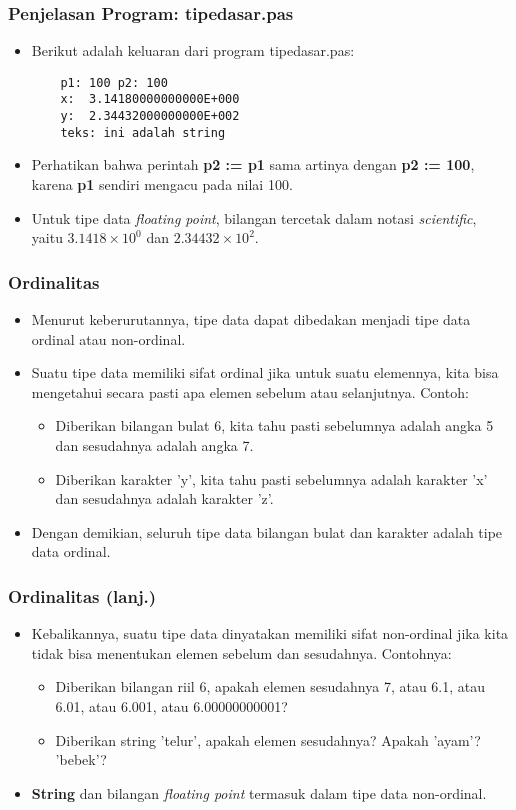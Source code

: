 \documentclass{beamer}
\begin{document}
\begin{frame}[fragile]
\frametitle{Penjelasan Program: tipedasar.pas}
\begin{itemize}
	\item Berikut adalah keluaran dari program tipedasar.pas:
	\begin{lstlisting}
	p1: 100 p2: 100
	x:  3.14180000000000E+000
	y:  2.34432000000000E+002
	teks: ini adalah string
	\end{lstlisting}
	\item Perhatikan bahwa perintah \textbf{p2 := p1} sama artinya dengan \textbf{p2 := 100}, karena \textbf{p1} sendiri mengacu pada nilai 100.
	\item Untuk tipe data \textit{floating point}, bilangan tercetak dalam notasi \textit{scientific}, yaitu $3.1418 \times 10^{0}$ dan $2.34432 \times 10^{2}$.
\end{itemize}
\end{frame}

\begin{frame}
\frametitle{Ordinalitas}
\begin{itemize}
	\item Menurut keberurutannya, tipe data dapat dibedakan menjadi tipe data \alert{ordinal} atau \alert{non-ordinal}.
	\item Suatu tipe data memiliki sifat ordinal jika untuk suatu elemennya, kita bisa mengetahui secara pasti apa elemen sebelum atau selanjutnya. Contoh:
	\begin{itemize}
		\item Diberikan bilangan bulat 6, kita tahu pasti sebelumnya adalah angka 5 dan sesudahnya adalah angka 7.
		\item Diberikan karakter 'y', kita tahu pasti sebelumnya adalah karakter 'x' dan sesudahnya adalah karakter 'z'.
	\end{itemize}
	\item Dengan demikian, seluruh tipe data bilangan bulat dan karakter adalah tipe data ordinal.
\end{itemize}
\end{frame}

\begin{frame}
\frametitle{Ordinalitas (lanj.)}
\begin{itemize}
	\item Kebalikannya, suatu tipe data dinyatakan memiliki sifat non-ordinal jika kita tidak bisa menentukan elemen sebelum dan sesudahnya. Contohnya:
	\begin{itemize}
		\item Diberikan bilangan riil 6, apakah elemen sesudahnya 7, atau 6.1, atau 6.01, atau 6.001, atau 6.00000000001?
		\item Diberikan string 'telur', apakah elemen sesudahnya? Apakah 'ayam'? 'bebek'?
	\end{itemize}
	\item \textbf{String} dan bilangan \textit{floating point} termasuk dalam tipe data non-ordinal.
\end{itemize}
\end{frame}
\end{document}
